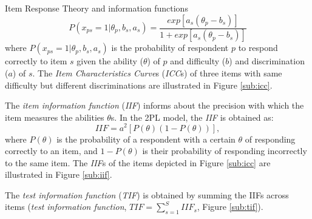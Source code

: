 \documentclass[final,t]{beamer}
\begin{document}
\begin{frame}
\begin{columns}[t]
\begin{column}{.45\linewidth}
\begin{block}{\centering Item Response Theory and information functions}
	\begin{equation}\label{eq:2pl}
		P(x_{ps} = 1|\theta_p, b_s, a_s) = \frac{exp[a_s(\theta_p - b_s)]}{1 + exp[a_s(\theta_p - b_s)]}
	\end{equation}
	where $P(x_{ps} = 1|\theta_p, b_s, a_s)$ is the probability of respondent $p$ to respond correctly to item $s$ given the ability ($\theta$) of $p$ and  difficulty ($b$) and discrimination ($a$) of $s$. 
	The \emph{Item Characteristics Curve}s (\emph{ICC}s) of three items with same difficulty but different discriminations are illustrated in Figure \ref{sub:icc}.
	
	The \emph{item information function} (\emph{IIF}) informs about the precision with which the item measures the abilities $\theta$s.
	In the 2PL model, the \emph{IIF} is obtained as: 
	\begin{equation}\label{eq:IIF}
		\mathit{IIF} = a^2[P(\theta)(1-P(\theta))],
	\end{equation}
	where $P(\theta)$ is the probability of a respondent with a certain $\theta$ of responding correctly to an item, and $1 - P(\theta)$ is their probability of  responding incorrectly to the same item. The \emph{IIF}s of the items depicted in Figure \ref{sub:icc} are illustrated in Figure \ref{sub:iif}. 
	
	The \emph{test information function} (\emph{TIF}) is obtained by summing the IIFs across items (\emph{test information function}, $ \mathit{TIF} = \sum_{s=1}^{S} \mathit{IIF}_s$, Figure \ref{sub:tif}). 
	

\end{block}
\end{column}
\end{columns}
\end{frame}
\end{document}
